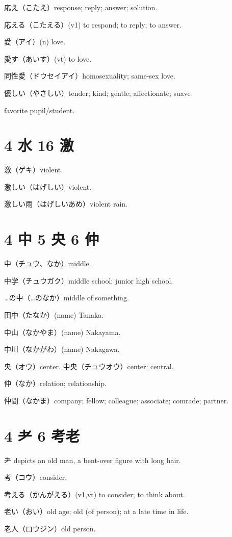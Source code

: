 応え（こたえ）response; reply; answer; solution.

応える（こたえる）(v1) to respond; to reply; to answer.

愛（アイ）(n) love.

愛す（あいす）(vt) to love.

同性愛（ドウセイアイ）homosexuality; same-sex love.

優しい（やさしい）tender; kind; gentle; affectionate; suave

favorite pupil/student.

\section{4 水 16 激}

激（ゲキ）violent.

激しい（はげしい）violent.

激しい雨（はげしいあめ）violent rain.

\section{4 中 5 央 6 仲}

中（チュウ、なか）middle.

中学（チュウガク）middle school; junior high school.

…の中（…のなか）middle of something.

田中（たなか）(name) Tanaka.

中山（なかやま）(name) Nakayama.

中川（なかがわ）(name) Nakagawa.

央（オウ）center.
中央（チュウオウ）center; central.

仲（なか）relation; relationship.

仲間（なかま）company; fellow; colleague; associate; comrade; partner.

\section{4 耂 6 考老}

耂 depicts an old man, a bent-over figure with long hair.

考（コウ）consider.

考える（かんがえる）(v1,vt) to consider; to think about.

老い（おい）old age; old (of person); at a late time in life.

老人（ロウジン）old person.


